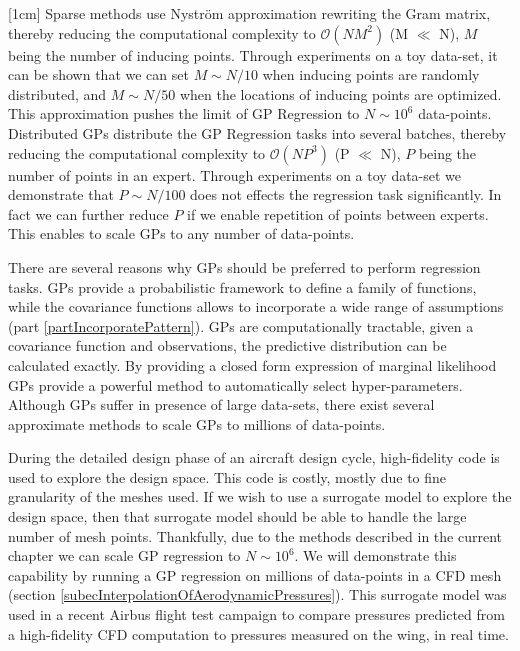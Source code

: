 [1cm]
Sparse methods use Nystr\"{o}m approximation rewriting the Gram matrix, thereby reducing the computational complexity to $\mathcal{O}(NM^{2})$ (M $\ll$ N), $M$ being the number of inducing points. Through experiments on a toy data-set, it can be shown that we can set $M \sim N/10$ when inducing points are randomly distributed, and $M \sim N/50$ when the locations of inducing points are optimized. This approximation pushes the limit of GP Regression to $N \sim 10^6$ data-points. Distributed GPs distribute the GP Regression tasks into several batches, thereby reducing the computational complexity to $\mathcal{O}(NP^{3})$ (P $\ll$ N), $P$ being the number of points in an expert. Through experiments on a toy data-set we demonstrate that $P \sim N/100$ does not effects the regression task significantly. In fact we can further reduce $P$ if we enable repetition of points between experts. This enables to scale GPs to any number of data-points.

There are several reasons why GPs should be preferred to perform regression tasks. GPs provide a probabilistic framework to define a family of functions, while the covariance functions allows to incorporate a wide range of assumptions (part \ref{partIncorporatePattern}). GPs are computationally tractable, given a covariance function and observations, the predictive distribution can be calculated exactly. By providing a closed form expression of marginal likelihood GPs provide a powerful method to automatically select hyper-parameters. Although GPs suffer in presence of large data-sets, there exist several approximate methods to scale GPs to millions of data-points. 

During the detailed design phase of an aircraft design cycle, high-fidelity code is used to explore the design space. This code is costly, mostly due to fine granularity of the meshes used. If we wish to use a surrogate model to explore the design space, then that surrogate model should be able to handle the large number of mesh points. Thankfully, due to the methods described in the current chapter we can scale GP regression to $N \sim 10^6$. We will demonstrate this capability by running a GP regression on millions of data-points in a CFD mesh (section \ref{subecInterpolationOfAerodynamicPressures}). This surrogate model was used in a recent Airbus flight test campaign to compare pressures predicted from a high-fidelity CFD computation to pressures measured on the wing, in real time.

